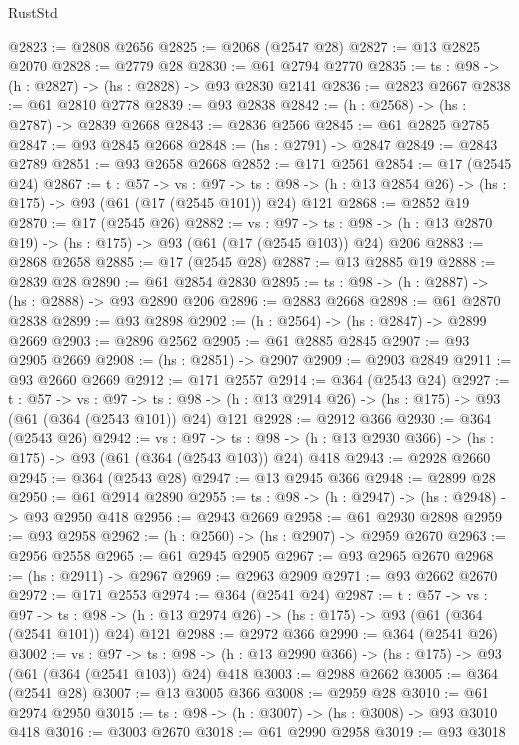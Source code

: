\begin{lexlean}{RustStd}
\begin{coremodule}
@2823 := @2808 @2656
@2825 := @2068 (@2547 @28)
@2827 := @13 @2825 @2070
@2828 := @2779 @28
@2830 := @61 @2794 @2770
@2835 := {ts : @98} -> (h : @2827) -> (hs : @2828) -> @93 @2830 @2141
@2836 := @2823 @2667
@2838 := @61 @2810 @2778
@2839 := @93 @2838
@2842 := (h : @2568) -> (hs : @2787) -> @2839 @2668
@2843 := @2836 @2566
@2845 := @61 @2825 @2785
@2847 := @93 @2845 @2668
@2848 := (hs : @2791) -> @2847
@2849 := @2843 @2789
@2851 := @93 @2658 @2668
@2852 := @171 @2561
@2854 := @17 (@2545 @24)
@2867 := {t : @57} ->
  {vs : @97} ->
  {ts : @98} -> (h : @13 @2854 @26) -> (hs : @175) -> @93 (@61 (@17 (@2545 @101)) @24) @121
@2868 := @2852 @19
@2870 := @17 (@2545 @26)
@2882 := {vs : @97} ->
  {ts : @98} -> (h : @13 @2870 @19) -> (hs : @175) -> @93 (@61 (@17 (@2545 @103)) @24) @206
@2883 := @2868 @2658
@2885 := @17 (@2545 @28)
@2887 := @13 @2885 @19
@2888 := @2839 @28
@2890 := @61 @2854 @2830
@2895 := {ts : @98} -> (h : @2887) -> (hs : @2888) -> @93 @2890 @206
@2896 := @2883 @2668
@2898 := @61 @2870 @2838
@2899 := @93 @2898
@2902 := (h : @2564) -> (hs : @2847) -> @2899 @2669
@2903 := @2896 @2562
@2905 := @61 @2885 @2845
@2907 := @93 @2905 @2669
@2908 := (hs : @2851) -> @2907
@2909 := @2903 @2849
@2911 := @93 @2660 @2669
@2912 := @171 @2557
@2914 := @364 (@2543 @24)
@2927 := {t : @57} ->
  {vs : @97} ->
  {ts : @98} -> (h : @13 @2914 @26) -> (hs : @175) -> @93 (@61 (@364 (@2543 @101)) @24) @121
@2928 := @2912 @366
@2930 := @364 (@2543 @26)
@2942 := {vs : @97} ->
  {ts : @98} -> (h : @13 @2930 @366) -> (hs : @175) -> @93 (@61 (@364 (@2543 @103)) @24) @418
@2943 := @2928 @2660
@2945 := @364 (@2543 @28)
@2947 := @13 @2945 @366
@2948 := @2899 @28
@2950 := @61 @2914 @2890
@2955 := {ts : @98} -> (h : @2947) -> (hs : @2948) -> @93 @2950 @418
@2956 := @2943 @2669
@2958 := @61 @2930 @2898
@2959 := @93 @2958
@2962 := (h : @2560) -> (hs : @2907) -> @2959 @2670
@2963 := @2956 @2558
@2965 := @61 @2945 @2905
@2967 := @93 @2965 @2670
@2968 := (hs : @2911) -> @2967
@2969 := @2963 @2909
@2971 := @93 @2662 @2670
@2972 := @171 @2553
@2974 := @364 (@2541 @24)
@2987 := {t : @57} ->
  {vs : @97} ->
  {ts : @98} -> (h : @13 @2974 @26) -> (hs : @175) -> @93 (@61 (@364 (@2541 @101)) @24) @121
@2988 := @2972 @366
@2990 := @364 (@2541 @26)
@3002 := {vs : @97} ->
  {ts : @98} -> (h : @13 @2990 @366) -> (hs : @175) -> @93 (@61 (@364 (@2541 @103)) @24) @418
@3003 := @2988 @2662
@3005 := @364 (@2541 @28)
@3007 := @13 @3005 @366
@3008 := @2959 @28
@3010 := @61 @2974 @2950
@3015 := {ts : @98} -> (h : @3007) -> (hs : @3008) -> @93 @3010 @418
@3016 := @3003 @2670
@3018 := @61 @2990 @2958
@3019 := @93 @3018

\end{coremodule}
\end{lexlean}
